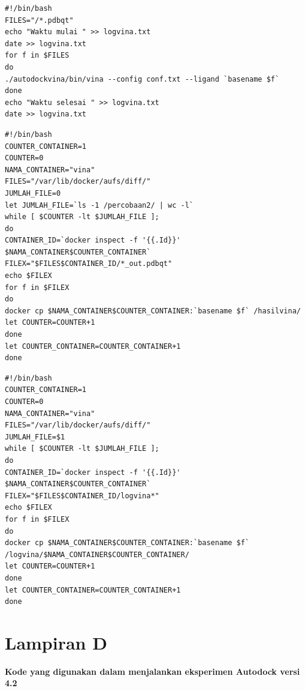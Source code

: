 \begin{lstlisting}[caption=\textit{Script} yang digunakan untuk menjalankan aplikasi Autodock Vina dalam container]
#!/bin/bash
FILES="/*.pdbqt"
echo "Waktu mulai " >> logvina.txt
date >> logvina.txt
for f in $FILES
do
./autodockvina/bin/vina --config conf.txt --ligand `basename $f`
done
echo "Waktu selesai " >> logvina.txt
date >> logvina.txt

\end{lstlisting}
\begin{lstlisting}[caption=\textit{Script} yang digunakan untuk mengambil hasil dari menjalankan aplikasi Autodock Vina pada container]
#!/bin/bash
COUNTER_CONTAINER=1
COUNTER=0
NAMA_CONTAINER="vina"
FILES="/var/lib/docker/aufs/diff/"
JUMLAH_FILE=0
let JUMLAH_FILE=`ls -1 /percobaan2/ | wc -l`
while [ $COUNTER -lt $JUMLAH_FILE ];
do
CONTAINER_ID=`docker inspect -f '{{.Id}}' $NAMA_CONTAINER$COUNTER_CONTAINER`
FILEX="$FILES$CONTAINER_ID/*_out.pdbqt"
echo $FILEX
for f in $FILEX
do
docker cp $NAMA_CONTAINER$COUNTER_CONTAINER:`basename $f` /hasilvina/
let COUNTER=COUNTER+1
done
let COUNTER_CONTAINER=COUNTER_CONTAINER+1
done

\end{lstlisting}

\begin{lstlisting}[caption=\textit{Script} yang digunakan untuk mengambil log dari masing - masing container]
#!/bin/bash
COUNTER_CONTAINER=1
COUNTER=0
NAMA_CONTAINER="vina"
FILES="/var/lib/docker/aufs/diff/"
JUMLAH_FILE=$1
while [ $COUNTER -lt $JUMLAH_FILE ];
do
CONTAINER_ID=`docker inspect -f '{{.Id}}' $NAMA_CONTAINER$COUNTER_CONTAINER`
FILEX="$FILES$CONTAINER_ID/logvina*"
echo $FILEX
for f in $FILEX
do
docker cp $NAMA_CONTAINER$COUNTER_CONTAINER:`basename $f` /logvina/$NAMA_CONTAINER$COUNTER_CONTAINER/
let COUNTER=COUNTER+1
done
let COUNTER_CONTAINER=COUNTER_CONTAINER+1
done

\end{lstlisting}

\chapter*{Lampiran D}
\textbf{Kode yang digunakan dalam menjalankan eksperimen Autodock versi 4.2} \\

